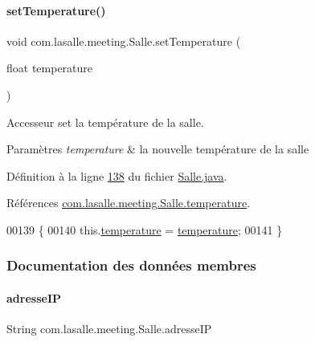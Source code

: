 \paragraph{\texorpdfstring{set\+Temperature()}{setTemperature()}}
{\footnotesize\ttfamily void com.\+lasalle.\+meeting.\+Salle.\+set\+Temperature (\begin{DoxyParamCaption}\item[{float}]{temperature }\end{DoxyParamCaption})}



Accesseur set la température de la salle. 


\begin{DoxyParams}{Paramètres}
{\em temperature} & la nouvelle température de la salle \\
\hline
\end{DoxyParams}


Définition à la ligne \hyperlink{_salle_8java_source_l00138}{138} du fichier \hyperlink{_salle_8java_source}{Salle.\+java}.



Références \hyperlink{_salle_8java_source_l00040}{com.\+lasalle.\+meeting.\+Salle.\+temperature}.


\begin{DoxyCode}
00139     \{
00140         this.\hyperlink{classcom_1_1lasalle_1_1meeting_1_1_salle_a31600559f77e2eeb1f6aa150b203213e}{temperature} = \hyperlink{classcom_1_1lasalle_1_1meeting_1_1_salle_a31600559f77e2eeb1f6aa150b203213e}{temperature};
00141     \}
\end{DoxyCode}


\subsubsection{Documentation des données membres}
\mbox{\label{classcom_1_1lasalle_1_1meeting_1_1_salle_ad83f4f49123c8d02f2fc0da484d3e812}} 
\paragraph{\texorpdfstring{adresse\+IP}{adresseIP}}
{\footnotesize\ttfamily String com.\+lasalle.\+meeting.\+Salle.\+adresse\+IP\hspace{0.3cm}{\ttfamily [private]}}



